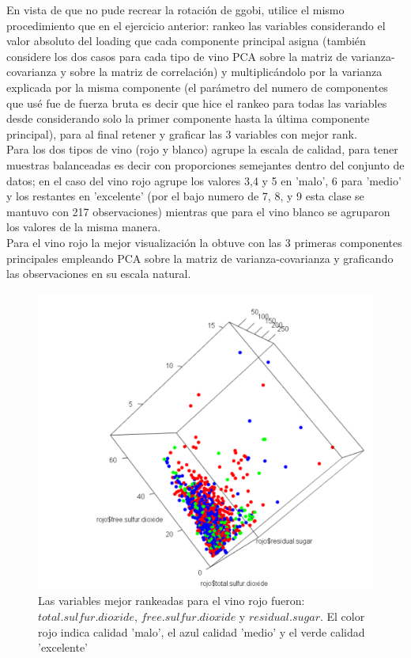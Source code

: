\documentclass[paper=letter, fontsize=11pt]{scrartcl}
\numberwithin{equation}{section} %
\numberwithin{figure}{section} %
\numberwithin{table}{section} %
\begin{document}
En vista de que no pude recrear la rotación de ggobi, utilice el mismo procedimiento que en el ejercicio anterior: rankeo las variables considerando el valor absoluto del loading que cada componente principal asigna (también considere los dos casos para cada tipo de vino PCA sobre la matriz de varianza-covarianza y sobre la matriz de correlación) y multiplicándolo por la varianza explicada por la misma componente (el parámetro del numero de componentes que usé fue de fuerza bruta es decir que hice el rankeo para todas las variables desde considerando solo la primer componente hasta la última componente principal), para al final retener y graficar las 3 variables con mejor rank.\\
Para los dos tipos de vino (rojo y blanco) agrupe la escala de calidad, para tener muestras balanceadas es decir con proporciones semejantes dentro del conjunto de datos; en el caso del vino rojo agrupe los valores 3,4 y 5 en 'malo', 6 para 'medio' y los restantes en 'excelente' (por el bajo numero de 7, 8, y 9 esta clase se mantuvo con 217 observaciones) mientras que para el vino blanco se agruparon los valores de la misma manera.\\
Para el vino rojo la mejor visualización la obtuve con las 3 primeras componentes principales empleando PCA sobre la matriz de varianza-covarianza y graficando las observaciones en su escala natural.\\

\begin{figure}[H]
  \begin{center}
    \includegraphics[scale=.3]{final_vino_rojo_sin_scalar.PNG}
    \caption{Las variables mejor rankeadas para el vino rojo fueron: $total.sulfur.dioxide$, $free.sulfur.dioxide$ y $residual.sugar$. El color rojo indica calidad 'malo', el azul calidad 'medio' y el verde calidad 'excelente'}
    \label{fig:separacion_vino_rojo}
  \end{center}
\end{figure}
\end{document}
